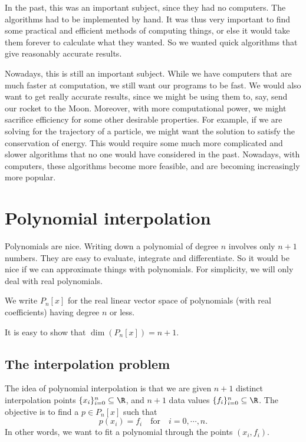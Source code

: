\documentclass[a4paper]{article}
\begin{document}
In the past, this was an important subject, since they had no computers. The algorithms had to be implemented by hand. It was thus very important to find some practical and efficient methods of computing things, or else it would take them forever to calculate what they wanted. So we wanted quick algorithms that give reasonably accurate results.

Nowadays, this is still an important subject. While we have computers that are much faster at computation, we still want our programs to be fast. We would also want to get really accurate results, since we might be using them to, say, send our rocket to the Moon. Moreover, with more computational power, we might sacrifice efficiency for some other desirable properties. For example, if we are solving for the trajectory of a particle, we might want the solution to satisfy the conservation of energy. This would require some much more complicated and slower algorithms that no one would have considered in the past. Nowadays, with computers, these algorithms become more feasible, and are becoming increasingly more popular.

\section{Polynomial interpolation}
Polynomials are nice. Writing down a polynomial of degree $n$ involves only $n + 1$ numbers. They are easy to evaluate, integrate and differentiate. So it would be nice if we can approximate things with polynomials. For simplicity, we will only deal with real polynomials.

\begin{notation}
  We write $P_n[x]$ for the real linear vector space of polynomials (with real coefficients) having degree $n$ or less.
\end{notation}
It is easy to show that $\dim (P_n[x]) = n + 1$.

\subsection{The interpolation problem}
The idea of polynomial interpolation is that we are given $n + 1$ distinct interpolation points $\{x_i\}_{i = 0}^n \subseteq \R$, and $n + 1$ data values $\{f_i\}_{i = 0}^n \subseteq \R$. The objective is to find a $p \in P_n[x]$ such that
\[
  p(x_i) = f_i\quad \text{for}\quad i = 0, \cdots, n.
\]
In other words, we want to fit a polynomial through the points $(x_i, f_i)$.
\end{document}
